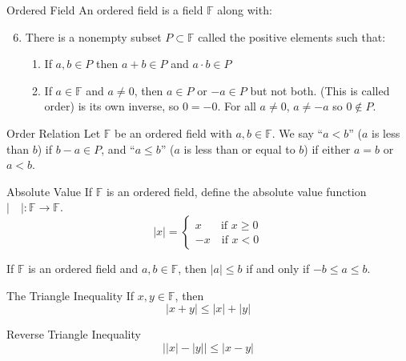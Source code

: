 \documentclass[12pt]{article}
\begin{document}
\begin{definition}{Ordered Field}{}
    An ordered field is a field $ \mathbb{F} $ along with:
    \begin{enumerate}
        \setcounter{enumi}{5}
        \item There is a nonempty subset $ P \subset \mathbb{F} $ called the positive elements such that:
        \begin{enumerate}
            \item If $ a, b \in P $ then $ a + b \in P $ and $ a \cdot b \in P $
            \item If $ a \in \mathbb{F} $ and $ a \neq 0 $, then $ a \in P $ or $ -a \in P $ but not both. (This is called order)
            \medskip
             is its own inverse, so $ 0 = -0 $. For all $ a \neq 0 $, $ a \neq -a $ so $ 0 \notin P $.
        \end{enumerate}
    \end{enumerate}
\end{definition}
\begin{definition}{Order Relation}{}
    Let $ \mathbb{F} $ be an ordered field with $ a, b \in \mathbb{F} $. We say ``$ a < b $'' ($ a $ is less than $ b $) if $ b - a \in P $, and ``$ a \leq b  $'' ($ a $ is less than or equal to $ b $) if either $ a = b $ or $ a < b $.
\end{definition}
\begin{definition}{Absolute Value}{}
    If $ \mathbb{F} $ is an ordered field, define the absolute value function $ | \quad | : \mathbb{F} \to \mathbb{F} $.
    \[ | x | = \begin{cases}
        x \quad \ \ \; \text{if } x \geq 0 \\
        -x \quad \text{if } x < 0
    \end{cases} \]
\end{definition}
\begin{proposition}{}{}
    If $ \mathbb{F} $ is an ordered field and $ a,b \in \mathbb{F} $, then $ |a| \leq b $ if and only if $ -b \leq a \leq b $.
\end{proposition}
\begin{theorem}{The Triangle Inequality}{}
    If $ x, y \in \mathbb{F} $, then
    \[ | x + y | \leq | x | + | y | \]
\end{theorem}
\begin{corollary}{Reverse Triangle Inequality}{}
    \[ \left| \left| x \right| - \left| y \right| \right| \leq | x - y | \]
\end{corollary}
\end{document}
